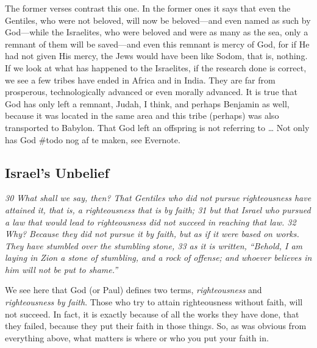 The former verses contrast this one. In the former ones it says that
even the Gentiles, who were not beloved, will now be beloved---and even
named as such by God---while the Israelites, who were beloved and were
as many as the sea, only a remnant of them will be saved---and even this
remnant is mercy of God, for if He had not given His mercy, the Jews
would have been like Sodom, that is, nothing. If we look at what has
happened to the Israelites, if the research done is correct, we see a
few tribes have ended in Africa and in India. They are far from
prosperous, technologically advanced or even morally advanced. It is
true that God has only left a remnant, Judah, I think, and perhaps
Benjamin as well, because it was located in the same area and this tribe
(perhaps) was also transported to Babylon. That God left an offspring is
not referring to \ldots{} Not only has God \#todo nog af te maken, see
Evernote.

\subsection{Israel's Unbelief} \emph{30 What shall we say, then? That
Gentiles who did not pursue righteousness have attained it, that is, a
righteousness that is by faith; 31 but that Israel who pursued a law
that would lead to righteousness did not succeed in reaching that law.
32 Why? Because they did not pursue it by faith, but as if it were based
on works. They have stumbled over the stumbling stone, 33 as it is
written,} \emph{``Behold, I am laying in Zion a stone of stumbling, and
a rock of offense; and whoever believes in him will not be put to
shame.''}

We see here that God (or Paul) defines two terms, \emph{righteousness}
and \emph{righteousness by faith}. Those who try to attain righteousness
without faith, will not succeed. In fact, it is exactly because of all
the works they have done, that they failed, because they put their faith
in those things. So, as was obvious from everything above, what matters
is where or who you put your faith in.

